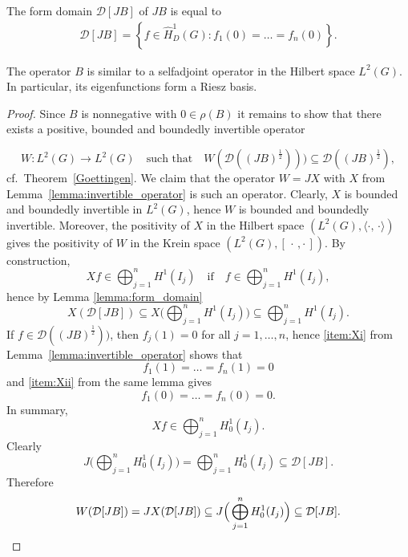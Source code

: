 \documentclass[10pt,a4paper]{amsart}
\newcommand{\AKone}{B}
\newcommand{\kip}{[\,\cdot\, , \cdot\,]}
\newcommand{\mD}{\mathcal{D}}
\newcommand{\scalar}[2]{\langle#1,\, #2\rangle}
\begin{document}
\begin{lemma}
   \label{lemma:form_domain}
   The form domain $\mD[J\AKone]$ of $J\AKone$ is equal to
   \begin{align}
      \label{eq:formdomainAone}
      \mD[J\AKone] = \left\{ f\in \widehat H^1_D(G)  : f_1(0) = \dots = f_n(0) \right\}.
   \end{align}
\end{lemma}

\begin{theorem}
   The operator $\AKone$ is similar to a selfadjoint operator in the Hilbert space $L^2(G)$. In particular, its eigenfunctions form a Riesz basis.
\end{theorem}

\begin{proof}
   Since $\AKone$ is nonnegative with $0\in \rho(\AKone)$ it remains to show that there exists a positive, bounded and boundedly invertible operator 

   $$
   W:L^2(G) \to L^2(G) \quad \mbox{such that} \quad 
   W(\mD(( J\AKone )^{\frac{1}{2}}))) \subseteq 
   \mD(( J\AKone )^{\frac{1}{2}}),
   $$
   cf.\ Theorem~\ref{Goettingen}.
   We claim that the operator $W = JX$ with $X$ from Lemma~\ref{lemma:invertible_operator} is such an operator.
   Clearly, $X$ is bounded and boundedly invertible in $L^2(G)$, hence $W$ is bounded and boundedly invertible.
   Moreover, the positivity of $X$ in the Hilbert space $(L^2(G),\scalar{\cdot}{\cdot})$ gives the positivity of $W$ in the Krein space $(L^2(G),\kip)$.
   By construction, 
   $$
   Xf\in \bigoplus_{j=1}^n H^1(I_j) \quad 
   \mbox{if} \quad f\in \bigoplus_{j=1}^n H^1(I_j),
   $$
   hence by Lemma \ref{lemma:form_domain}
   $$
   X(\mD[J\AKone])\subseteq X\Big(\bigoplus_{j=1}^n H^1(I_j)\Big)\subseteq \bigoplus_{j=1}^n H^1(I_j).
   $$
   If $f\in \mD( (J\AKone)^{\frac{1}{2}}) )$, then $f_j(1) = 0$ for all $j=1,\dots, n$, 
   hence \ref{item:Xi} from Lemma~\ref{lemma:invertible_operator} shows that 
   $$
   f_1(1) = \dots = f_n(1) = 0
   $$
   and \ref{item:Xii} from the same lemma gives 
   $$
   f_1(0) = \dots = f_n(0) = 0.
   $$
   In summary, 
   $$
   Xf\in \bigoplus_{j=1}^n H_0^1(I_j).
   $$
   Clearly 
   $$
   J \Big( \bigoplus_{j=1}^n H_0^1(I_j) \Big) = \bigoplus_{j=1}^n H_0^1(I_j) \subseteq \mD[J\AKone].
   $$
   Therefore
   \begin{equation*}
      W(\mD[J\AKone]) = JX(\mD[J\AKone])
      \subseteq J \Big( \bigoplus_{j=1}^n H_0^1(I_j) \Big)
      \subseteq \mD[J\AKone].
      \qedhere
   \end{equation*}
\end{proof}
\end{document}
